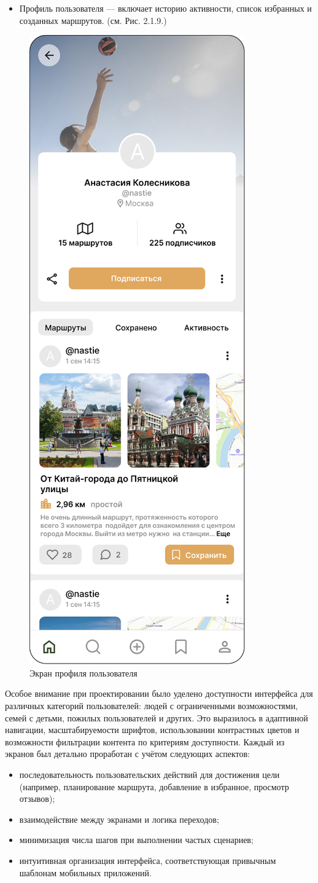\begin{itemize}
    \item Профиль пользователя — включает историю активности, список избранных и созданных маршрутов. (см. Рис. 2.1.9.)
\end{itemize}
\begin{figure}[H]
        \centering
        \includegraphics[width=0.4\linewidth]{Images/ui/Picture9.png}
        \caption{Экран профиля пользователя}
        \label{fig:ui_screen_9}
\end{figure}
Особое внимание при проектировании было уделено доступности интерфейса для различных категорий пользователей: людей с ограниченными возможностями, семей с детьми, пожилых пользователей и других. Это выразилось в адаптивной навигации, масштабируемости шрифтов, использовании контрастных цветов и возможности фильтрации контента по критериям доступности.
Каждый из экранов был детально проработан с учётом следующих аспектов:
\begin{itemize}
    \item последовательность пользовательских действий для достижения цели (например, планирование маршрута, добавление в избранное, просмотр отзывов);
    \item взаимодействие между экранами и логика переходов;
    \item минимизация числа шагов при выполнении частых сценариев;
    \item интуитивная организация интерфейса, соответствующая привычным шаблонам мобильных приложений.
\end{itemize}


